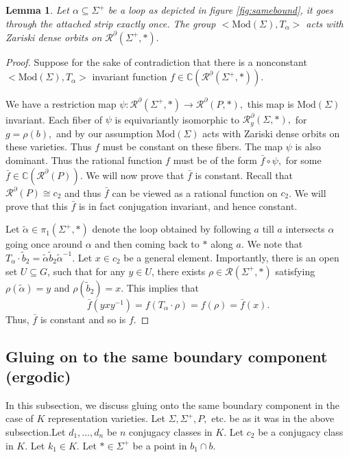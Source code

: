 \documentclass{article}
\newcommand{\Rc}{\mathcal{R}}
\newcommand{\CC}{\mathbb{C}}
\newcommand{\Mod}{\textrm{Mod}}
\newtheorem{lemma}{Lemma}[theorem]
\begin{document}
\begin{lemma}\label{indsamebound}
    Let $\alpha \subseteq \Sigma^+$ be a loop  as depicted in figure \ref{fig:samebound}, it goes through the attached strip exactly once.
The group $<\Mod(\Sigma), T_{\alpha}>$ acts with Zariski dense orbits on $\Rc^{\partial}(\Sigma^+, *).$
\end{lemma}
\begin{proof}
    Suppose for the sake of contradiction that there is a nonconstant $<\Mod(\Sigma), T_{\alpha}>$  invariant function $f \in \CC(\Rc^{\partial}(\Sigma^+, *)).$

  We have a restriction map $\psi: \Rc^{\partial}(\Sigma^+,*) \to\Rc^{\partial}(P, *),$ this map is $\Mod(\Sigma)$ invariant. Each fiber of $\psi$ is equivariantly isomorphic to   $\Rc_g^{\partial}(\Sigma, *),$ for $g = \rho(b),$ and by our assumption $\Mod(\Sigma)$ acts with Zariski dense orbits on these varieties. Thus $f$ must be constant on these fibers. The map $\psi$ is also dominant. Thus the rational function $f$ must be of the form $\bar f \circ \psi,$ for some $\bar f \in \CC(\Rc^{\partial}(P)).$ 
    We will now prove that $\bar f$ is constant. Recall that $\Rc^{\partial}(P) \cong c_2$ and thus $\bar f$ can be viewed as a rational function on $c_2$. We will prove that this $\bar f$ is in fact conjugation invariant, and hence constant.
    
    Let $\tilde \alpha\in \pi_1(\Sigma^+ , *)$ denote the loop obtained by following $a$ till $a$ intersects $\alpha$ going once around $\alpha$ and then coming back to $*$ along $a$.  We note that $T_{\alpha} \cdot \tilde b_2 = \tilde {\alpha} \tilde b_2 \tilde {\alpha}^{-1}.$ Let $x \in c_2$ be a general element. Importantly, there is an open set $U \subseteq G$, such that for any $y \in U$, there exists $\rho \in \Rc(\Sigma^+, *)$ satisfying $\rho(\tilde \alpha) =y$ and $\rho(\tilde b_2) = x$. This implies  that $$ \bar f (yxy^{-1})= f(T_{\alpha} \cdot \rho)= f(\rho) = \bar f(x).$$ Thus, $\bar f$ is constant and so is $f$.
\end{proof}
\subsection{Gluing on to the same boundary component (ergodic)}
In this subsection, we discuss gluing onto the same boundary component in  the case of $K$ representation varieties. 
Let $\Sigma, \Sigma^+ , P,$ etc. be as it was in the above subsection.Let $d_1 ,\dots, d_n$ be $n$ conjugacy classes in $K$. Let $c_2$ be a conjugacy class in $K$. Let $k_1 \in K.$ Let $* \in \Sigma^+$ be a point in $b_1 \cap b$.
   
\end{document}
